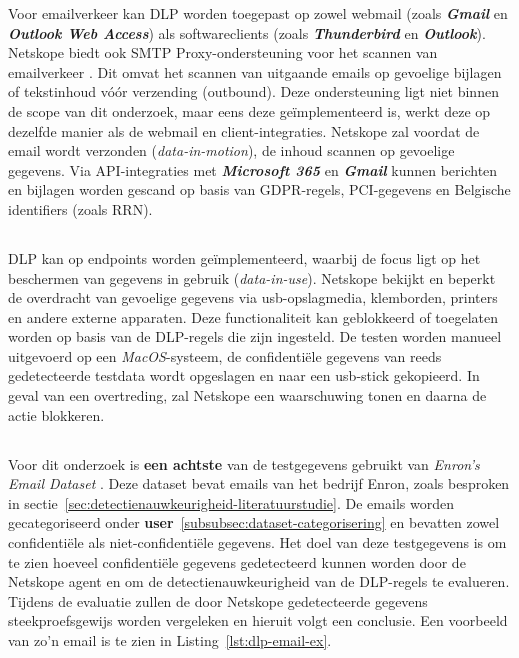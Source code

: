 Voor emailverkeer kan DLP worden toegepast op zowel webmail (zoals \textbf{\textit{Gmail}} en \textbf{\textit{Outlook Web Access}}) als softwareclients (zoals \textbf{\textit{Thunderbird}} en \textbf{\textit{Outlook}}).
Netskope biedt ook SMTP Proxy-ondersteuning voor het scannen van emailverkeer \autocite{Netskope2025Email}. Dit omvat het scannen van uitgaande emails op gevoelige bijlagen of tekstinhoud vóór verzending (outbound).
Deze ondersteuning ligt niet binnen de scope van dit onderzoek, maar eens deze geïmplementeerd is, werkt deze op dezelfde manier als de webmail en client-integraties.
Netskope zal voordat de email wordt verzonden (\textit{data-in-motion}), de inhoud scannen op gevoelige gegevens.
Via API-integraties met \textbf{\textit{Microsoft 365}} en \textbf{\textit{Gmail}} kunnen berichten en bijlagen worden gescand op basis van GDPR-regels, PCI-gegevens en Belgische identifiers (zoals RRN).

\subsection{}
\label{subsubsec:endpoint-poc}

DLP kan op endpoints worden geïmplementeerd, waarbij de focus ligt op het beschermen van gegevens in gebruik (\textit{data-in-use}). 
Netskope bekijkt en beperkt de overdracht van gevoelige gegevens via \gls{usb}-opslagmedia, klemborden, printers en andere externe apparaten.
Deze functionaliteit kan geblokkeerd of toegelaten worden op basis van de DLP-regels die zijn ingesteld.
De testen worden manueel uitgevoerd op een \textit{MacOS}-systeem, de confidentiële gegevens van reeds gedetecteerde testdata wordt opgeslagen en naar een \gls{usb}-stick gekopieerd.
In geval van een overtreding, zal Netskope een waarschuwing tonen en daarna de actie blokkeren.

\subsection{}
\label{subsubsec:poc-testgegevens}

Voor dit onderzoek is \textbf{een achtste} van de testgegevens gebruikt van \textit{Enron's Email Dataset} \autocite{Cukierski2015Enron}.
Deze dataset bevat emails van het bedrijf Enron, zoals besproken in sectie~\ref{sec:detectienauwkeurigheid-literatuurstudie}.
De emails worden gecategoriseerd onder \textbf{user}~\ref{subsubsec:dataset-categorisering} en bevatten zowel confidentiële als niet-confidentiële gegevens.
Het doel van deze testgegevens is om te zien hoeveel confidentiële gegevens gedetecteerd kunnen worden door de Netskope agent en om de detectienauwkeurigheid van de DLP-regels te evalueren.
Tijdens de evaluatie zullen de door Netskope gedetecteerde gegevens steekproefsgewijs worden vergeleken en hieruit volgt een conclusie.
Een voorbeeld van zo'n email is te zien in Listing~\ref{lst:dlp-email-ex}.

